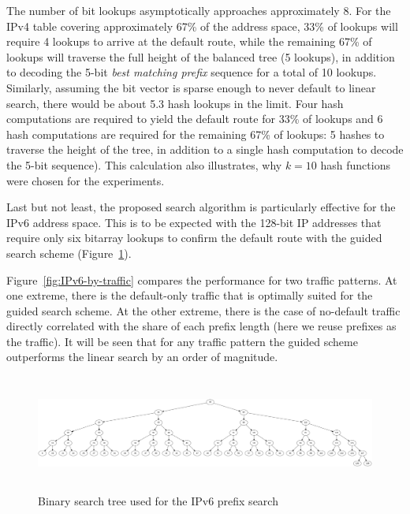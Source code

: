\documentclass[conference,compsoc]{IEEEtran}
\begin{document}
The number of bit lookups asymptotically approaches approximately 8. 
For the IPv4 table covering
approximately 67\% of the address space, 33\% of lookups will
require 4 lookups to arrive at the default route, while the remaining
67\% of lookups will
traverse the full height of the balanced tree (5 lookups), in addition to
decoding the 5-bit \emph{best matching prefix} sequence for a total of
10 lookups. Similarly, assuming the bit vector is sparse enough to never
default to linear search, there would be about 5.3 hash lookups in the limit.
Four hash computations are required to yield the default route for
33\% of lookups and 6 hash computations are required
for the remaining 67\% of lookups: 5 hashes to traverse the height of the 
tree, in addition to a single hash computation to decode the 5-bit sequence).
This calculation also illustrates, why $k=10$ hash functions were chosen
for the experiments.

Last but not least, the proposed search algorithm is particularly effective
for the IPv6 address space. This is to be expected with the 128-bit IP
addresses that require only six bitarray lookups to confirm the default
route with the guided search scheme (Figure~\ref{fig:IPv6-tree}).

Figure~\ref{fig:IPv6-by-traffic} compares the performance for two traffic 
patterns. At one extreme, there is the default-only
traffic that is optimally suited for the guided search scheme. At the other
extreme, there is the case of no-default traffic directly correlated with 
the share of each prefix
length (here we reuse prefixes as the traffic). It will be seen that for any
traffic pattern the guided scheme outperforms the linear search
by an order of magnitude.





\clearpage
\begin{figure}[p]
\centering
\includegraphics[height=1.5in]{../img/ipv6_balanced_tree.png}
  \caption{Binary search tree used for the IPv6 prefix search}
\label{fig:IPv6-tree}
\end{figure}
\end{document}
